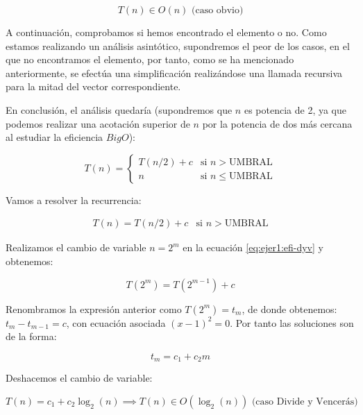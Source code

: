 \begin{equation}
	\boxed{T(n) \in O (n)} \text{ (caso obvio)}
	\label{eq:1a-obvio-eficiencia}
\end{equation}

A continuación, comprobamos si hemos encontrado el elemento o no. Como estamos realizando un análisis asintótico, supondremos
el peor de los casos, en el que no encontramos el elemento, por tanto, como se ha mencionado anteriormente,
se efectúa una simplificación realizándose una llamada recursiva para la mitad del vector correspondiente.

En conclusión, el análisis quedaría (supondremos que $n$ es potencia de 2, ya que podemos realizar una acotación 
superior de $n$ por la potencia de dos más cercana al estudiar la eficiencia $Big O$): 

\begin{equation}
    T(n) = \left\{ \begin{array}{lr} T(n/2) + c & \text{si } n > \text{UMBRAL}\\ n & \text{si } n \leqslant \text{UMBRAL} \end{array} \right.
    \label{eq:1a-efi-dyv-rec}
\end{equation}

Vamos a resolver la recurrencia:

\begin{equation}
    \begin{array}{lr}  T(n) =  T(n/2) + c & \text{si } n > \text{UMBRAL} \end{array}
    \label{eq:ejer1:efi-dyv}
\end{equation}

Realizamos el cambio de variable $n = 2^{m}$ en la ecuación \ref{eq:ejer1:efi-dyv} y obtenemos:

\begin{equation*}
    T(2^{m}) =  T(2^{m-1}) + c 
\end{equation*}

Renombramos la expresión anterior como $T(2^{m}) = t_{m}$, de donde obtenemos: $t_{m} - t_{m-1} = c$, con
ecuación asociada $(x-1)^{2} = 0$. Por tanto las soluciones son de la forma: 

\begin{equation*}
    t_{m} = c_{1} + c_{2}m
\end{equation*}

Deshacemos el cambio de variable:

\begin{equation}
    T(n) = c_{1} + c_{2} \log_2(n) \implies \boxed{T(n) \in O(\log_2(n))}
    \text{ (caso Divide y Vencerás)}
    \label{eq:1a-eficiencia-lineal}
\end{equation}

